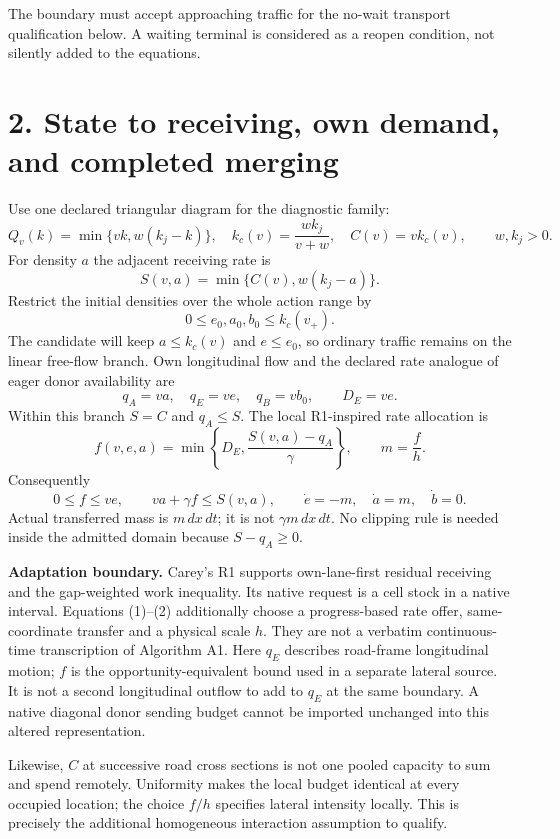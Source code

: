 \documentclass[11pt,a4paper]{article}
\begin{document}
The boundary must accept approaching traffic for the no-wait transport
qualification below. A waiting terminal is considered as a reopen condition,
not silently added to the equations.

\section*{2. State to receiving, own demand, and completed merging}
Use one declared triangular diagram for the diagnostic family:
\[
 Q_v(k)=\min\{vk,w(k_j-k)\},\quad
 k_c(v)=\frac{wk_j}{v+w},\quad C(v)=v k_c(v),\qquad w,k_j>0.
\]
For density $a$ the adjacent receiving rate is
\[
 S(v,a)=\min\{C(v),w(k_j-a)\}.
\]
Restrict the initial densities over the whole action range by
\[
 0\leq e_0,a_0,b_0\leq k_c(v_+).
 \tag{A}
\]
The candidate will keep $a\leq k_c(v)$ and $e\leq e_0$, so ordinary traffic
remains on the linear free-flow branch. Own longitudinal flow and the declared
rate analogue of eager donor availability are
\[
 q_A=va,\quad q_E=ve,\quad q_B=vb_0,\qquad D_E=ve.
\]
Within this branch $S=C$ and $q_A\leq S$. The local R1-inspired rate allocation
is
\[
 f(v,e,a)=\min\left\{D_E,\frac{S(v,a)-q_A}{\gamma}\right\},\qquad
 m=\frac{f}{h}.
 \tag{1}
\]
Consequently
\[
 0\leq f\leq ve,\qquad va+\gamma f\leq S(v,a),\qquad
 \dot e=-m,\quad \dot a=m,\quad \dot b=0.
 \tag{2}
\]
Actual transferred mass is $m\,dx\,dt$; it is not $\gamma m\,dx\,dt$.
No clipping rule is needed inside the admitted domain because $S-q_A\geq0$.

\textbf{Adaptation boundary.} Carey's R1 supports own-lane-first residual
receiving and the gap-weighted work inequality. Its native request is a
cell stock in a native interval. Equations (1)--(2) additionally choose a
progress-based rate offer, same-coordinate transfer and a physical scale $h$.
They are not a verbatim continuous-time transcription of Algorithm A1. Here
$q_E$ describes road-frame longitudinal motion; $f$ is the opportunity-equivalent
bound used in a separate lateral source. It is not a second longitudinal
outflow to add to $q_E$ at the same boundary. A native diagonal donor sending
budget cannot be imported unchanged into this altered representation.

Likewise, $C$ at successive road cross sections is not one pooled capacity
to sum and spend remotely. Uniformity makes the local budget identical at
every occupied location; the choice $f/h$ specifies lateral intensity locally.
This is precisely the additional homogeneous interaction assumption to qualify.
\end{document}
